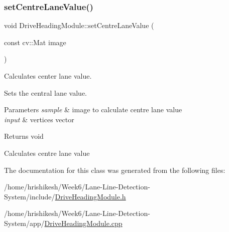 \subsubsection{\texorpdfstring{set\+Centre\+Lane\+Value()}{setCentreLaneValue()}}
{\footnotesize\ttfamily void Drive\+Heading\+Module\+::set\+Centre\+Lane\+Value (\begin{DoxyParamCaption}\item[{const cv\+::\+Mat}]{image }\end{DoxyParamCaption})}



Calculates center lane value. 

Sets the central lane value.


\begin{DoxyParams}{Parameters}
{\em sample} & image to calculate centre lane value\\
\hline
{\em input} & vertices vector\\
\hline
\end{DoxyParams}
\begin{DoxyReturn}{Returns}
void 
\end{DoxyReturn}
Calculates centre lane value 

The documentation for this class was generated from the following files\+:\begin{DoxyCompactItemize}
\item 
/home/hrishikesh/\+Week6/\+Lane-\/\+Line-\/\+Detection-\/\+System/include/\mbox{\hyperlink{_drive_heading_module_8h}{Drive\+Heading\+Module.\+h}}\item 
/home/hrishikesh/\+Week6/\+Lane-\/\+Line-\/\+Detection-\/\+System/app/\mbox{\hyperlink{_drive_heading_module_8cpp}{Drive\+Heading\+Module.\+cpp}}\end{DoxyCompactItemize}
